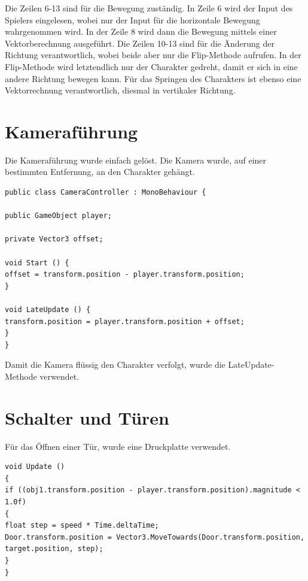 Die Zeilen 6-13 sind für die Bewegung zuständig. In Zeile 6 wird der Input des Spielers eingelesen, wobei nur der Input für die horizontale Bewegung wahrgenommen wird. In der Zeile 8 wird dann die Bewegung mittels einer Vektorberechnung ausgeführt. Die Zeilen 10-13 sind für die Änderung der Richtung verantwortlich, wobei beide aber nur die Flip-Methode aufrufen. In der Flip-Methode wird letztendlich nur der Charakter gedreht, damit er sich in eine andere Richtung bewegen kann. Für das Springen des Charakters ist ebenso eine Vektorrechnung verantwortlich, diesmal in vertikaler Richtung.

\section{Kameraführung}
Die Kameraführung wurde einfach gelöst. Die Kamera wurde, auf einer bestimmten Entfernung, an den Charakter gehängt.

\begin{lstlisting}[language={[Sharp]C}, caption=Camera-Script]
public class CameraController : MonoBehaviour {

public GameObject player;

private Vector3 offset;

void Start () {
offset = transform.position - player.transform.position;
}

void LateUpdate () {
transform.position = player.transform.position + offset;
}
}
\end{lstlisting}
Damit die Kamera flüssig den Charakter verfolgt, wurde die LateUpdate-Methode verwendet.

\section{Schalter und Türen}
Für das Öffnen einer Tür, wurde eine Druckplatte verwendet.
\begin{lstlisting}[language={[Sharp]C}, caption=PressurePlate-Script]
void Update ()
{
if ((obj1.transform.position - player.transform.position).magnitude < 1.0f)
{
float step = speed * Time.deltaTime;
Door.transform.position = Vector3.MoveTowards(Door.transform.position, target.position, step);
}
}
\end{lstlisting}


